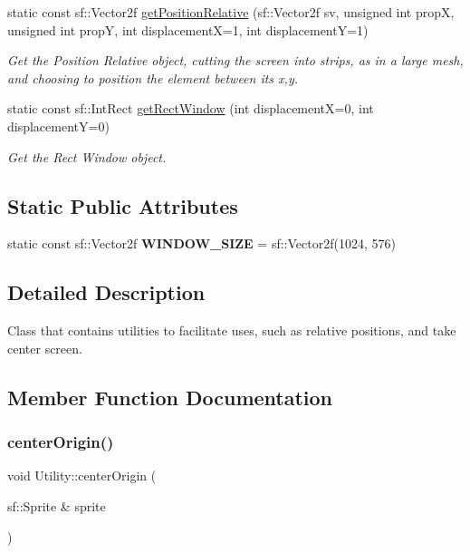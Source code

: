 \begin{DoxyCompactItemize}
static const sf\+::\+Vector2f \hyperlink{classUtility_a4eedd5b332f25c2fd8b8aaa21e104b71}{get\+Position\+Relative} (sf\+::\+Vector2f sv, unsigned int propX, unsigned int propY, int displacementX=1, int displacementY=1)
\begin{DoxyCompactList}\small\item\em Get the Position Relative object, cutting the screen into strips, as in a large mesh, and choosing to position the element between its x,y. \end{DoxyCompactList}\item 
static const sf\+::\+Int\+Rect \hyperlink{classUtility_a0fb51a6c84ab339bb52434a8b805fa20}{get\+Rect\+Window} (int displacementX=0, int displacementY=0)
\begin{DoxyCompactList}\small\item\em Get the Rect Window object. \end{DoxyCompactList}\end{DoxyCompactItemize}
\subsection*{Static Public Attributes}
\begin{DoxyCompactItemize}
\item 
\mbox{\label{classUtility_a417cff4a0f693a4fd0e7bd93af05a351}} 
static const sf\+::\+Vector2f {\bfseries W\+I\+N\+D\+O\+W\+\_\+\+S\+I\+ZE} = sf\+::\+Vector2f(1024, 576)
\end{DoxyCompactItemize}


\subsection{Detailed Description}
Class that contains utilities to facilitate uses, such as relative positions, and take center screen. 

\subsection{Member Function Documentation}
\mbox{\label{classUtility_a740b125c33224b1845cc8cd34481344f}} 
\subsubsection{\texorpdfstring{center\+Origin()}{centerOrigin()}\hspace{0.1cm}{\footnotesize\ttfamily [1/3]}}
{\footnotesize\ttfamily void Utility\+::center\+Origin (\begin{DoxyParamCaption}\item[{sf\+::\+Sprite \&}]{sprite }\end{DoxyParamCaption})\hspace{0.3cm}{\ttfamily [static]}}



